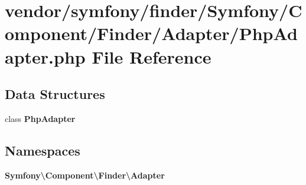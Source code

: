 \section{vendor/symfony/finder/\+Symfony/\+Component/\+Finder/\+Adapter/\+Php\+Adapter.php File Reference}
\label{_php_adapter_8php}
\subsection*{Data Structures}
\begin{DoxyCompactItemize}
\item 
class {\bf Php\+Adapter}
\end{DoxyCompactItemize}
\subsection*{Namespaces}
\begin{DoxyCompactItemize}
\item 
 {\bf Symfony\textbackslash{}\+Component\textbackslash{}\+Finder\textbackslash{}\+Adapter}
\end{DoxyCompactItemize}
